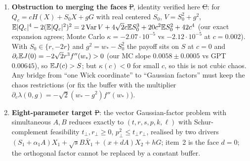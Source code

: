 \documentclass[11pt,a4paper]{article}
\begin{document}
\begin{enumerate}
\item \textbf{Obstruction to merging the faces} \st{P}, identity verified here \st{C}: for $Q_c=cH(X)+S_0X+gG$ with real centered $S_0$, $V=S_0^2+g^2$,
$\mathbb{E}|Q_c|^4-2(\mathbb{E}|Q_c|^2)^2=2\operatorname{Var} V+4\sqrt2c\mathbb{E} S_0^3+20c^2\mathbb{E} S_0^2+42c^4$ (our exact expansion agrees; Monte Carlo $\kappa=-2.07\cdot10^{-5}$ vs $-2.12\cdot10^{-5}$ at $c=0.002$). With $S_0\in\{r,-2r\}$ and $g^2=w_*-S_0^2$
the payoff sits on $S$ at $c=0$ and $\partial_c\mathbb{E} J(0)=-2\sqrt2r^3f''(w_*)>0$ (our MC slope $0.0058\pm0.0005$ vs GPT $0.00645$), so $\mathbb{E} J(c)>S$; but $\kappa(c)<0$ for small $c$, so this is not cubic chaos. Any bridge from
``one Wick coordinate'' to ``Gaussian factors'' must keep the chaos restrictions (or fix the buffer with the multiplier $\partial_c\lambda(0,g)=-\sqrt2(w_*-g^2)f''(w_*)$).
\item \textbf{Eight-parameter target} \st{P}: the vector Gaussian-factor problem with simultaneous $A,B$ reduces exactly to $(t,r,s,p,k,\ell)$ with Schur-complement feasibility $t_\perp,r_\perp\ge0$, $p_\perp^2\le t_\perp r_\perp$,
realised by two drivers $(S_1+\alpha_1A)X_1+\sqrt sB\bar X_1+(x+dA)X_2+hG$; item~2 is the face $d=0$; the orthogonal factor cannot be replaced by a constant buffer.
\end{enumerate}
\end{document}
